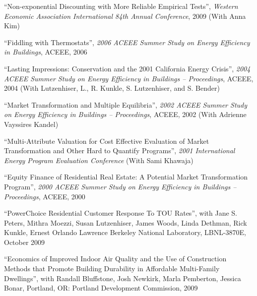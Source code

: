 \documentclass[Computer Science]{vita}
\begin{document}
\begin{vita}
\begin{Publications}
\begin{Papers at Refereed Conferences}
    \item ``Non-exponential Discounting with More Reliable Empirical
      Tests'', \emph{Western Economic Association International 84th
        Annual Conference}, 2009 (With Anna Kim)

    \item ``Fiddling with Thermostats'', \emph{2006 ACEEE Summer Study
        on Energy Efficiency in Buildings}, ACEEE, 2006

    \item ``Lasting Impressions: Conservation and the 2001 California
      Energy Crisis'', \emph{2004 ACEEE Summer Study on Energy
        Efficiency in Buildings -- Proceedings}, ACEEE, 2004 (With
      Lutzenhiser, L., R. Kunkle, S. Lutzenhiser, and S. Bender)

    \item ``Market Transformation and Multiple Equilibria'',
      \emph{2002 ACEEE Summer Study on Energy Efficiency in Buildings
        -- Proceedings}, ACEEE, 2002 (With Adrienne Vayssires Kandel)
	
    \item ``Multi-Attribute Valuation for Cost Effective Evaluation of
      Market Transformation and Other Hard to Quantify Programs'',
      \emph{2001 International Energy Program Evaluation Conference}
      (With Sami Khawaja)
	
    \item ``Equity Finance of Residential Real Estate: A Potential
      Market Transformation Program'', \emph{2000 ACEEE Summer Study
        on Energy Efficiency in Buildings -- Proceedings}, ACEEE, 2000
    \end{Papers at Refereed Conferences}
   
    \begin{Unrefereed Public Reports}
    
    \item ``PowerChoice Residential Customer Response To TOU Rates'',
      with Jane S. Peters, Mithra Moezzi, Susan Lutzenhiser, James
      Woods, Linda Dethman, Rick Kunkle, Ernest Orlando Lawrence Berkeley National Laboratory, LBNL-3870E, October 2009
    
    \item ``Economics of Improved Indoor Air Quality and the Use of
      Construction Methods that Promote Building Durability in
      Affordable Multi-Family Dwellings'', with Randall Bluffstone,
      Josh Newkirk, Marla Pemberton, Jessica Bonar, Portland, OR:
      Portland Development Commission, 2009


\end{Unrefereed Public Reports}
\end{Publications}
\end{vita}
\end{document}
